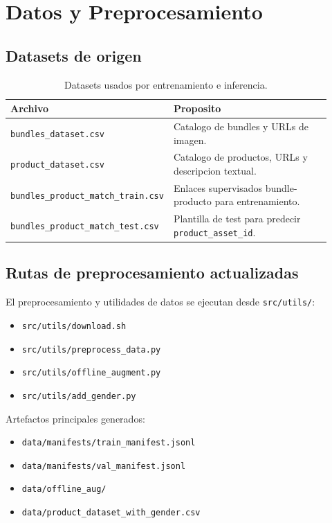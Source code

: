 \section{Datos y Preprocesamiento}

\subsection{Datasets de origen}

\begin{table}[h]
  \centering
  \small
  \begin{tabular}{p{0.36\linewidth} p{0.56\linewidth}}
    \toprule
    \textbf{Archivo} & \textbf{Proposito} \\
    \midrule
    \texttt{bundles\_dataset.csv} & Catalogo de bundles y URLs de imagen. \\
    \texttt{product\_dataset.csv} & Catalogo de productos, URLs y descripcion textual. \\
    \texttt{bundles\_product\_match\_train.csv} & Enlaces supervisados bundle-producto para entrenamiento. \\
    \texttt{bundles\_product\_match\_test.csv} & Plantilla de test para predecir \texttt{product\_asset\_id}. \\
    \bottomrule
  \end{tabular}
  \caption{Datasets usados por entrenamiento e inferencia.}
  \label{tab:datasets}
\end{table}

\subsection{Rutas de preprocesamiento actualizadas}

El preprocesamiento y utilidades de datos se ejecutan desde \texttt{src/utils/}:
\begin{itemize}
  \item \texttt{src/utils/download.sh}
  \item \texttt{src/utils/preprocess\_data.py}
  \item \texttt{src/utils/offline\_augment.py}
  \item \texttt{src/utils/add\_gender.py}
\end{itemize}

Artefactos principales generados:
\begin{itemize}
  \item \texttt{data/manifests/train\_manifest.jsonl}
  \item \texttt{data/manifests/val\_manifest.jsonl}
  \item \texttt{data/offline\_aug/}
  \item \texttt{data/product\_dataset\_with\_gender.csv}
\end{itemize}
